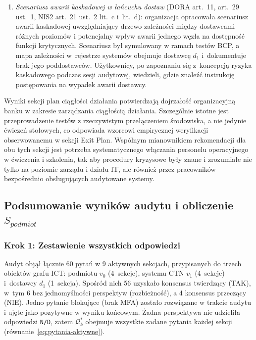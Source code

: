 \begin{enumerate}[label=(\roman*)]
\item \textit{Scenariusz awarii kaskadowej w łańcuchu dostaw} (DORA art.~11, art.~29 ust.~1, NIS2 art.~21 ust.~2 lit.~c i~lit.~d): organizacja opracowała scenariusz awarii kaskadowej uwzględniający drzewo zależności między dostawcami różnych poziomów i potencjalny wpływ awarii jednego węzła na dostępność funkcji krytycznych. Scenariusz był symulowany w ramach testów BCP, a mapa zależności w~rejestrze systemów obejmuje dostawcę $d_1$ i~dokumentuje brak jego poddostawców. Użytkownicy, po zapoznaniu się z~koncepcją ryzyka kaskadowego podczas sesji audytowej, wiedzieli, gdzie znaleźć instrukcję postępowania na wypadek awarii dostawcy.
\end{enumerate}

Wyniki sekcji plan ciągłości działania potwierdzają dojrzałość organizacyjną banku w zakresie zarządzania ciągłością działania. Szczególnie istotne jest przeprowadzenie testów z rzeczywistym przełączeniem środowiska, a nie jedynie ćwiczeń stołowych, co odpowiada wzorcowi empirycznej weryfikacji obserwowanemu w sekcji Exit Plan. Wspólnym mianownikiem rekomendacji dla obu tych sekcji jest potrzeba systematycznego włączania personelu operacyjnego w ćwiczenia i szkolenia, tak aby procedury kryzysowe były znane i zrozumiałe nie tylko na poziomie zarządu i działu IT, ale również przez pracowników bezpośrednio obsługujących audytowane systemy.

\subsection{Podsumowanie wyników audytu i obliczenie $S_{podmiot}$}

\subsubsection*{Krok 1: Zestawienie wszystkich odpowiedzi}

Audyt objął łącznie 60 pytań w 9 aktywnych sekcjach, przypisanych do trzech obiektów grafu ICT: podmiotu $v_0$ (4~sekcje), systemu CTN $v_1$ (4~sekcje) i~dostawcy $d_1$ (1~sekcja). Spośród nich 56 uzyskało konsensus twierdzący (TAK), w~tym 6 bez jednomyślności perspektyw (rozbieżność), a 4 konsensus przeczący (NIE). Jedno pytanie blokujące (brak MFA) zostało rozwiązane w trakcie audytu i ujęte jako pozytywne w wyniku końcowym. Żadna perspektywa nie udzieliła odpowiedzi \texttt{N/D}, zatem $\mathcal{Q}^{*}_k$ obejmuje wszystkie zadane pytania każdej sekcji (równanie~\eqref{eq:pytania-aktywne}).


